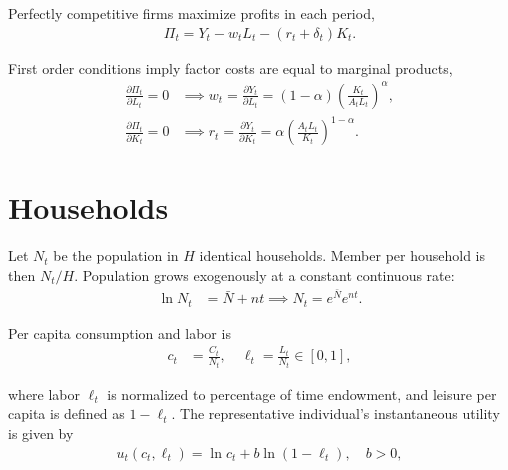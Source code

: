 \documentclass[../main.tex]{subfiles}
\begin{document}
        \vspace{0.5cm}
        
        Perfectly competitive firms maximize profits in each period, 
        \begin{align}
            \Pi_t = Y_{t} - w_t L_t - (r_t + \delta_t) K_t.    
        \end{align}
        
        First order conditions imply factor costs are equal to marginal products,
        \begin{align}
            \frac{\partial \Pi_t}{\partial L_t} = 0
            &\implies
            w_t
            = \frac{\partial Y_t}{\partial L_t} = (1-\alpha) \left(\frac{K_t}{A_t L_t}\right)^\alpha,
            \label{eqn:wage}
            \\
            \frac{\partial \Pi_t}{\partial K_t} = 0
            &\implies
            r_t
            = \frac{\partial Y_t}{\partial K_t} = \alpha \left(\frac{A_t L_t}{K_t}\right)^{1-\alpha}.
            \label{eqn:interest}
        \end{align}
        
    \section{Households}
        
        Let $N_t$ be the population in $H$ identical households. Member per household is then $N_t / H$. Population grows exogenously at a constant continuous rate:
        \begin{align}
            \ln N_t &= \bar{N} + nt
            \implies
            N_t = e^{\bar{N}}e^{nt}. \label{eqn:population}
        \end{align}
        
        Per capita consumption and labor is
        \begin{align}
            c_t &= \frac{C_t}{N_t}, \quad
            \ell_t = \frac{L_t}{N_t} \in [0, 1],
        \end{align}
        
        where labor $\ell_t$ is normalized to percentage of time endowment, and leisure per capita is defined as $1-\ell_t$. The representative individual's instantaneous utility is given by
        \begin{align}
            u_t(c_t, \ell_t) = \ln c_t + b \ln(1-\ell_t),
            \quad b > 0,
        \end{align}
        
\end{document}

